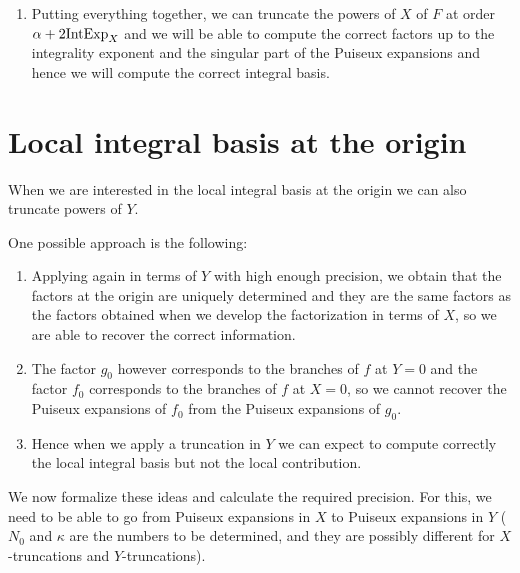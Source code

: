 \documentclass[a4paper,11pt,reqno]{amsart}%
\theoremstyle{definition}
\theoremstyle{plain}
\theoremstyle{remark}
\newcommand\ct[1]{\text{\rmfamily\upshape #1}}
\newcommand{\IntExpX}{\ct{IntExp}_X}
\begin{document}
\begin{enumerate}
\item Putting everything together, we can truncate the powers of $X$ of $F$ at order $\alpha + 2 \IntExpX$ and we will be able to compute the correct factors up to the integrality exponent and the singular part of the Puiseux expansions and hence we will compute the correct integral basis.

\end{enumerate}

\section{Local integral basis at the origin}

When we are interested in the local integral basis at the origin we can also truncate powers of $Y$.

One possible approach is the following:
\begin{enumerate}
\item Applying again \cite[Proposition 23]{poteaux2021}  in terms of $Y$ with high enough precision, we obtain that the factors at the origin are uniquely determined and they are the same factors as the factors obtained when we develop the factorization in terms of $X$, so we are able to recover the correct information.
\item The factor $g_0$ however corresponds to the branches of $f$ at $Y = 0$ and the factor $f_0$ corresponds to the branches of $f$ at $X = 0$, so we cannot recover the Puiseux expansions of $f_0$ from the Puiseux expansions of $g_0$.
\item Hence when we apply a truncation in $Y$ we can expect to compute correctly the local integral basis but not the local contribution.
\end{enumerate}

We now formalize these ideas and calculate the required precision. For this, we need to be able to go from Puiseux expansions in $X$ to Puiseux expansions in $Y$ ($N_0$ and $\kappa$ are the numbers to be determined, and they are possibly different for $X$-truncations and $Y$-truncations).
\end{document}
